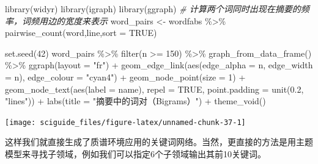 \documentclass[]{tufte-book}
\newenvironment{Shaded}{}{}
\newcommand{\AttributeTok}[1]{\textcolor[rgb]{0.49,0.56,0.16}{#1}}
\newcommand{\CommentTok}[1]{\textcolor[rgb]{0.38,0.63,0.69}{\textit{#1}}}
\newcommand{\ConstantTok}[1]{\textcolor[rgb]{0.53,0.00,0.00}{#1}}
\newcommand{\DecValTok}[1]{\textcolor[rgb]{0.25,0.63,0.44}{#1}}
\newcommand{\FloatTok}[1]{\textcolor[rgb]{0.25,0.63,0.44}{#1}}
\newcommand{\FunctionTok}[1]{\textcolor[rgb]{0.02,0.16,0.49}{#1}}
\newcommand{\NormalTok}[1]{#1}
\newcommand{\OtherTok}[1]{\textcolor[rgb]{0.00,0.44,0.13}{#1}}
\newcommand{\SpecialCharTok}[1]{\textcolor[rgb]{0.25,0.44,0.63}{#1}}
\newcommand{\StringTok}[1]{\textcolor[rgb]{0.25,0.44,0.63}{#1}}
\begin{document}
\begin{Shaded}
\begin{Highlighting}[]
\FunctionTok{library}\NormalTok{(widyr)}
\FunctionTok{library}\NormalTok{(igraph)}
\FunctionTok{library}\NormalTok{(ggraph)}
\CommentTok{\# 计算两个词同时出现在摘要的频率，词频用边的宽度来表示}
\NormalTok{word\_pairs }\OtherTok{\textless{}{-}}\NormalTok{ wordfabs }\SpecialCharTok{\%\textgreater{}\%}
        \FunctionTok{pairwise\_count}\NormalTok{(word,line,}\AttributeTok{sort =} \ConstantTok{TRUE}\NormalTok{)}

\FunctionTok{set.seed}\NormalTok{(}\DecValTok{42}\NormalTok{)}
\NormalTok{word\_pairs }\SpecialCharTok{\%\textgreater{}\%}
  \FunctionTok{filter}\NormalTok{(n }\SpecialCharTok{\textgreater{}=} \DecValTok{150}\NormalTok{) }\SpecialCharTok{\%\textgreater{}\%}
  \FunctionTok{graph\_from\_data\_frame}\NormalTok{() }\SpecialCharTok{\%\textgreater{}\%}
  \FunctionTok{ggraph}\NormalTok{(}\AttributeTok{layout =} \StringTok{"fr"}\NormalTok{) }\SpecialCharTok{+}
  \FunctionTok{geom\_edge\_link}\NormalTok{(}\FunctionTok{aes}\NormalTok{(}\AttributeTok{edge\_alpha =}\NormalTok{ n, }\AttributeTok{edge\_width =}\NormalTok{ n), }\AttributeTok{edge\_colour =} \StringTok{"cyan4"}\NormalTok{) }\SpecialCharTok{+}
  \FunctionTok{geom\_node\_point}\NormalTok{(}\AttributeTok{size =} \DecValTok{1}\NormalTok{) }\SpecialCharTok{+}
  \FunctionTok{geom\_node\_text}\NormalTok{(}\FunctionTok{aes}\NormalTok{(}\AttributeTok{label =}\NormalTok{ name), }\AttributeTok{repel =} \ConstantTok{TRUE}\NormalTok{, }
                 \AttributeTok{point.padding =} \FunctionTok{unit}\NormalTok{(}\FloatTok{0.2}\NormalTok{, }\StringTok{"lines"}\NormalTok{)) }\SpecialCharTok{+}
  \FunctionTok{labs}\NormalTok{(}\AttributeTok{title =} \StringTok{"摘要中的词对（Bigrams）"}\NormalTok{) }\SpecialCharTok{+}
  \FunctionTok{theme\_void}\NormalTok{()}
\end{Highlighting}
\end{Shaded}

\texttt{[image: sciguide\_files/figure-latex/unnamed-chunk-37-1]}

这样我们就直接生成了质谱环境应用的关键词网络。当然，更直接的方法是用主题模型来寻找子领域，例如我们可以指定6个子领域输出其前10关键词。
\end{document}
